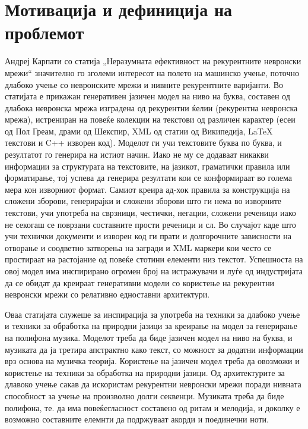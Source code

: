 \chapter{Мотивација и дефиниција на проблемот}
\label{ch:motivacija}

Андреј Карпати со статија „Неразумната ефективност на рекурентните невронски мрежи“ \cite{AndrejKarpathy2015} значително го зголеми интересот на полето на машинско учење, поточно длабоко учење со невронските мрежи и нивните рекурентните варијанти. Во статијата е прикажан генеративен јазичен модел на ниво на буква, составен од длабока невронска мрежа изградена од рекурентни ќелии (рекурентна невронска мрежа), истрениран на повеќе колекции на текстови од различен карактер (есеи од Пол Греам, драми од Шекспир, XML од статии од Википедија, LaTeX текстови и C++ изворен код). Моделот ги учи текстовите буква по буква, и резултатот го генерира на истиот начин. Иако не му се додаваат никакви информации за структурата на текстовите, на јазикот, граматички правила или форматирање, тој успева да генерира резултати кои се конформираат во голема мера кон изворниот формат. Самиот креира ад-хок правила за конструкција на сложени зборови, генерирајки и сложени зборови што ги нема во изворните текстови, учи употреба на сврзници, честички, негации, сложени реченици иако не секогаш се поврзани составните прости реченици и сл. Во случајот каде што учи технички документи и изворен код ги прати и долгорочните зависности на отворање и соодветно затворења на загради и XML маркери кои често се простираат на растојание од повеќе стотини елементи низ текстот. Успешноста на овој модел има инспирирано огромен број на истражувачи и луѓе од индустријата да се обидат да креираат генеративни модели со користење на рекурентни невронски мрежи со релативно едноставни архитектури. 

Оваа статијата служеше за инспирација за употреба на техники за длабоко учење и техники за обработка на природни јазици за креирање на модел за генерирање на полифона музика. Моделот треба да биде јазичен модел на ниво на буква, и музиката да ја третира апстрактно како текст, со можност за додатни информации врз основа на музичка теорија. Користење на јазичен модел треба да овозможи и користење на техники за обработка на природни јазици. Од архитектурите за длавоко учење сакав да искористам рекурентни невронски мрежи поради нивната способност за учење на произволно долги секвенци. Музиката треба да биде полифона, те. да има повеќегласност составено од ритам и мелодија, и доколку е возможно составните елемнти да подржуваат акорди и поединечни ноти.

